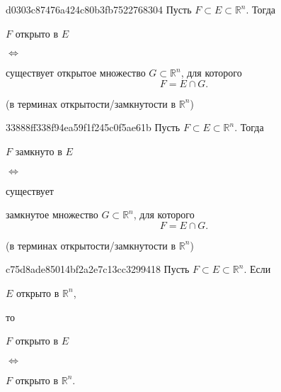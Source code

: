 \begin{note}{d0303c87476a424c80b3fb7522768304}
    Пусть \({ F \subset E \subset \mathbb R^{n} }\).
    Тогда \begin{icloze}{2}\({ F }\) открыто в \({ E }\)\end{icloze} \begin{icloze}{3}\({ \iff }\)\end{icloze}
    \begin{icloze}{1}
        существует открытое множество \({ G \subset \mathbb R^{n} }\), для которого
        \[
            F = E \cap G.
        \]
    \end{icloze}

    \begin{center}
        \tiny (в терминах открытости/замкнутости в \({ \mathbb R^{n} }\))
    \end{center}
\end{note}

\begin{note}{33888ff338f94ea59f1f245c0f5ae61b}
    Пусть \({ F \subset E \subset \mathbb R^{n} }\).
    Тогда \begin{icloze}{2}\({ F }\) замкнуто в \({ E }\)\end{icloze} \begin{icloze}{3}\({ \iff }\)\end{icloze} существует
    \begin{icloze}{1}
        замкнутое множество \({ G \subset \mathbb R^{n} }\), для которого
        \[
            F = E \cap G.
        \]
    \end{icloze}

    \begin{center}
        \tiny (в терминах открытости/замкнутости в \({ \mathbb R^{n} }\))
    \end{center}
\end{note}

\begin{note}{c75d8ade85014bf2a2e7c13cc3299418}
    Пусть \({ F \subset E \subset \mathbb R^{n} }\).
    Если \begin{icloze}{4}\({ E }\) открыто в \({ \mathbb R^{n} }\),\end{icloze} то
    \begin{center}
        \begin{icloze}{2}\({ F }\) открыто в \({ E }\)\end{icloze} \begin{icloze}{3}\({ \iff }\)\end{icloze} \begin{icloze}{1}\({ F }\) открыто в \({ \mathbb R^{n} }\).\end{icloze}
    \end{center}
\end{note}

